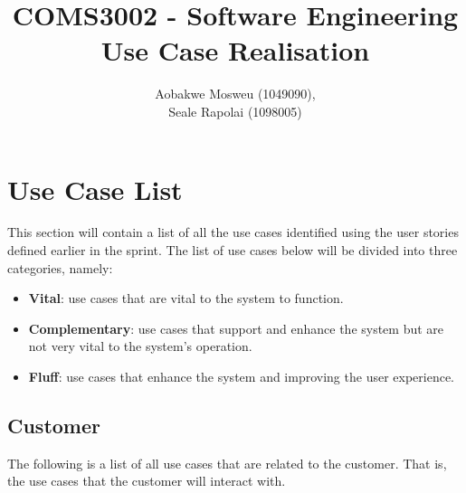 \documentclass[11pt]{article}
\begin{document}
	\title{
		COMS3002 - Software Engineering\\
		\large Use Case Realisation
	}
	\author{Aobakwe Mosweu (1049090), \\Seale Rapolai (1098005)}
	\maketitle
	
	\clearpage
	\tableofcontents
	\clearpage
	
	\section{Use Case List}
	\begin{flushleft}
		This section will contain a list of all the use cases identified using the user stories defined earlier in the sprint. The list of use cases below will be divided into three categories, namely:
	\end{flushleft}
	\begin{itemize}
		\item \textbf{Vital}: use cases that are vital to the system to function.
		\item \textbf{Complementary}: use cases that support and enhance the system but are not very vital to the system's operation.
		\item \textbf{Fluff}: use cases that enhance the system and improving the user experience.
	\end{itemize}
	
		\subsection{Customer}
		\begin{flushleft}
			The following is a list of all use cases that are related to the customer. That is, the use cases that the customer will interact with.
		\end{flushleft}
	
\end{document}
